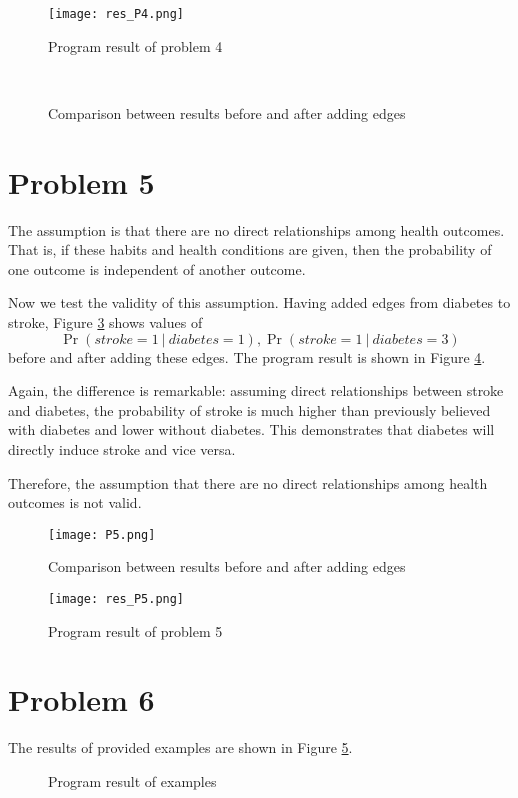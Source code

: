 \documentclass[12pt]{article}
\begin{document}
\begin{figure}[H]
    \centering
    \texttt{[image: res\_P4.png]}
    \caption{Program result of problem 4}
    \label{res_P4}
\end{figure}
\begin{figure}
    \centering
    \\
    \caption{\label{P4_cmp}Comparison between results before and after adding edges}
\end{figure}


\section{Problem 5}
The assumption is that there are no direct relationships among health outcomes. That is, if these habits and health conditions are given, then the probability of one outcome is independent of another outcome.\par
Now we test the validity of this assumption. Having added edges from diabetes to stroke, Figure \ref{P5_cmp} shows values of
$$\Pr(stroke=1 \ |\ diabetes=1), \Pr(stroke=1 \ |\ diabetes=3)$$
before and after adding these edges. The program result is shown in Figure \ref{res_P5}.\par
Again, the difference is remarkable: assuming direct relationships between stroke and diabetes, the probability of stroke is much higher than previously believed with diabetes and lower without diabetes. This demonstrates that diabetes will directly induce stroke and vice versa.\par
Therefore, the assumption that there are no direct relationships among health outcomes is not valid.\par

\begin{figure}
    \centering
    \texttt{[image: P5.png]}
    \caption{Comparison between results before and after adding edges}
    \label{P5_cmp}
\end{figure}
\begin{figure}
    \centering
    \texttt{[image: res\_P5.png]}
    \caption{Program result of problem 5}
    \label{res_P5}
\end{figure}


\section{Problem 6}
The results of provided examples are shown in Figure \ref{res_P6}.\par
\begin{figure}[H]
    \centering
    \hspace{3pt}
    \caption{\label{res_P6}Program result of examples}
\end{figure}
\end{document}
